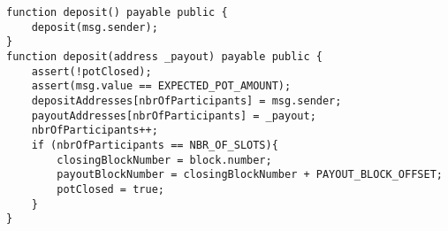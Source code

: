 \begin{lstlisting}[basicstyle=\small]
function deposit() payable public {
    deposit(msg.sender);
}
function deposit(address _payout) payable public {
    assert(!potClosed);
    assert(msg.value == EXPECTED_POT_AMOUNT);
    depositAddresses[nbrOfParticipants] = msg.sender;
    payoutAddresses[nbrOfParticipants] = _payout;
    nbrOfParticipants++;
    if (nbrOfParticipants == NBR_OF_SLOTS){
        closingBlockNumber = block.number;
        payoutBlockNumber = closingBlockNumber + PAYOUT_BLOCK_OFFSET;
        potClosed = true;
    }
}
\end{lstlisting}

